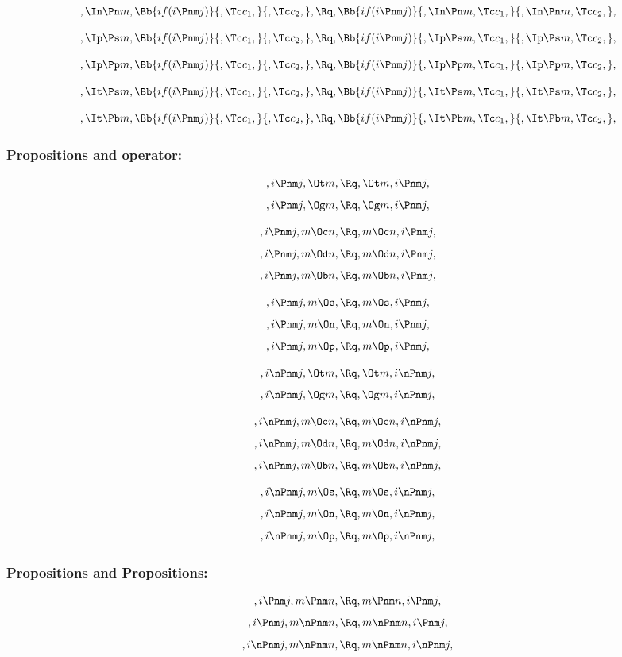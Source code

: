 \[,\In \Pn m, \Bb{if(i \Pnm j)}{,\Tc c_1,}{,\Tc c_2,}, \Rq , \Bb{if(i \Pnm j)}{,\In \Pn m,\Tc c_1,}{,\In \Pn m,\Tc c_2,},\]
\bigskip
\bigskip

\[,\Ip \Ps m, \Bb{if(i \Pnm j)}{,\Tc c_1,}{,\Tc c_2,}, \Rq , \Bb{if(i \Pnm j)}{,\Ip \Ps m,\Tc c_1,}{,\Ip \Ps m,\Tc c_2,},\]
\bigskip
\bigskip

\[,\Ip \Pp m, \Bb{if(i \Pnm j)}{,\Tc c_1,}{,\Tc c_2,}, \Rq , \Bb{if(i \Pnm j)}{,\Ip \Pp m,\Tc c_1,}{,\Ip \Pp m,\Tc c_2,},\]
\bigskip
\bigskip

\[,\It \Ps m, \Bb{if(i \Pnm j)}{,\Tc c_1,}{,\Tc c_2,}, \Rq , \Bb{if(i \Pnm j)}{,\It \Ps m, \Tc c_1,}{,\It \Ps m, \Tc c_2,},\]
\bigskip
\bigskip

\[,\It \Pb m, \Bb{if(i \Pnm j)}{,\Tc c_1,}{,\Tc c_2,}, \Rq , \Bb{if(i \Pnm j)}{,\It \Pb m, \Tc c_1,}{,\It \Pb m, \Tc c_2,},\]
\bigskip
\bigskip







\bigskip
\bigskip
\bigskip
\bigskip
\subsubsection{ Propositions and operator:}
\[, i \Pnm j, \Ot m, \Rq , \Ot m, i \Pnm j,\]
\[, i \Pnm j, \Og m, \Rq , \Og m, i \Pnm j,\]

\[, i \Pnm j, m \Oc n, \Rq , m \Oc n, i \Pnm j,\]
\[, i \Pnm j, m \Od n, \Rq , m \Od n, i \Pnm j,\]
\[, i \Pnm j, m \Ob n, \Rq , m \Ob n, i \Pnm j,\]

\[, i \Pnm j, m \Os, \Rq , m \Os, i \Pnm j,\]
\[, i \Pnm j, m \On, \Rq , m \On, i \Pnm j,\]
\[, i \Pnm j, m \Op, \Rq , m \Op, i \Pnm j,\]

\bigskip
\bigskip
\[, i \nPnm j, \Ot m, \Rq , \Ot m, i \nPnm j,\]
\[, i \nPnm j, \Og m, \Rq , \Og m, i \nPnm j,\]

\[, i \nPnm j, m \Oc n, \Rq , m \Oc n, i \nPnm j,\]
\[, i \nPnm j, m \Od n, \Rq , m \Od n, i \nPnm j,\]
\[, i \nPnm j, m \Ob n, \Rq , m \Ob n, i \nPnm j,\]

\[, i \nPnm j, m \Os, \Rq , m \Os, i \nPnm j,\]
\[, i \nPnm j, m \On, \Rq , m \On, i \nPnm j,\]
\[, i \nPnm j, m \Op, \Rq , m \Op, i \nPnm j,\]







\bigskip
\bigskip
\bigskip
\bigskip
\subsubsection{ Propositions and Propositions:}
\[,i \Pnm j, m \Pnm n, \Rq , m \Pnm n, i \Pnm j,\]
\[,i \Pnm j, m \nPnm n, \Rq , m \nPnm n, i \Pnm j,\]
\[,i \nPnm j, m \nPnm n, \Rq , m \nPnm n, i \nPnm j,\]

